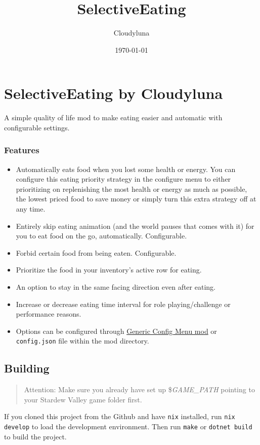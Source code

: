 \documentclass[a4paper,12pt]{article}
\title{SelectiveEating}
\author{Cloudyluna}
\date{\today}
\begin{document}
	
	\section{SelectiveEating by Cloudyluna}
	
	A simple quality of life mod to make eating easier and automatic with configurable settings.
	
	\subsubsection{Features}
	
	\begin{itemize}
		\item Automatically eats food when you lost some health or energy. You can configure this eating priority strategy in the configure menu to either prioritizing on replenishing the most health or energy as much as possible, the lowest priced food to save money or simply turn this extra strategy off at any time.
		\item Entirely skip eating animation (and the world pauses that comes with it) for you to eat food on the go, automatically. Configurable.
		\item Forbid certain food from being eaten. Configurable.
		\item Prioritize the food in your inventory's active row for eating.
		\item An option to stay in the same facing direction even after eating.
		\item Increase or decrease eating time interval for role playing/challenge or performance reasons.
		\item Options can be configured through \href{https://www.nexusmods.com/stardewvalley/mods/5098}{Generic Config Menu mod} or \texttt{config.json} file within the mod directory.
	\end{itemize}
	
	
	\subsection{Building}
	
	\begin{quote}
		Attention: Make sure you already have set up \$\textit{GAME\_PATH} pointing to your Stardew Valley game folder first.
	\end{quote}

	If you cloned this project from the Github and have \texttt{nix} installed, run \texttt{nix develop} to load the development environment. Then run \texttt{make} or \texttt{dotnet build} to build the project.
	
\end{document}
